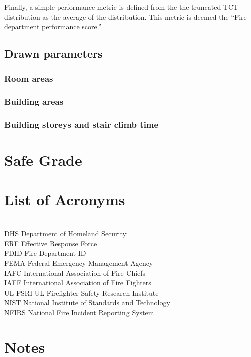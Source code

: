 \documentclass[12pt,oneside]{book}
\begin{document}
Finally, a simple performance metric is defined from the the truncated TCT distribution as the average of the distribution. This metric is deemed the ``Fire department performance score.''

\section{Drawn parameters}
\subsection{Room areas}
\subsection{Building areas}
\subsection{Building storeys and stair climb time}


\chapter{Safe Grade}










\chapter{List of Acronyms}

\begin{tabbing}
\hspace{1.5in} \= \\

DHS \> Department of Homeland Security \\
ERF \> Effective Response Force \\
FDID \> Fire Department ID \\
FEMA \> Federal Emergency Management Agency \\
IAFC \> International Association of Fire Chiefs \\
IAFF \> International Association of Fire Fighters \\
UL FSRI \> UL Firefighter Safety Research Institute \\
NIST \> National Institute of Standards and Technology  \\
NFIRS \> National Fire Incident Reporting System \\
\end{tabbing}



\chapter*{Notes}
\end{document}
